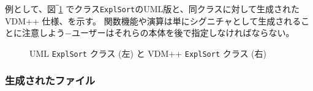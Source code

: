 \documentclass[\pformat,12pt]{jarticle}
\newcommand{\vdmpp}{VDM++}
\begin{document}
例として、図‾\ref{fig:ExplSortVDMUML} でクラス{\tt ExplSort}のUML版と、同クラスに対して生成された \vdmpp{} 仕様、を示す。
関数機能や演算は単にシグニチャとして生成されることに注意しよう−ユーザーはそれらの本体を後で指定しなければならない。


\begin{figure}[htb]
\begin{center}
\mbox{}
\hspace{0.2cm}
\caption{UML {\tt ExplSort} クラス (左) と \vdmpp{} {\tt ExplSort} クラス (右)　\label{fig:ExplSortVDMUML}}
\end{center}
\end{figure}

\subsubsection*{生成されたファイル}
\end{document}
